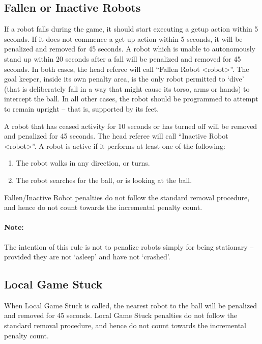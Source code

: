 \documentclass[12pt]{article}
\begin{document}
\subsection{Fallen or Inactive Robots}
\label{sec:fallenrobots}

If a robot falls during the game, it should start executing a getup action within 5 seconds. If it does not commence a get up action within 5 seconds, it will be penalized and removed for 45 seconds. 
A robot which is unable to autonomously stand up within 20 seconds after a fall will be penalized and removed for 45 seconds. 
In both cases, the head referee will call ``Fallen Robot  \textless robot\textgreater''.
The goal keeper, inside its own penalty area, is the only robot permitted to `dive' (that is deliberately fall in a way that might cause its torso, arms or hands) to intercept the ball. In all other cases, the robot should be programmed to attempt to remain upright -- that is, supported by its feet.

A robot that has ceased activity for 10 seconds or has turned off will be removed and penalized for 45 seconds.
The head referee will call ``Inactive Robot  \textless robot\textgreater''.
A robot is active if it performs at least one of the following:
\begin{enumerate}
  \item The robot walks in any direction, or turns.
  \item The robot searches for the ball, or is looking at the ball.
\end{enumerate}

Fallen/Inactive Robot penalties do not follow the standard removal procedure, and hence do not count towards the incremental penalty count.

\paragraph{Note:} The intention of this rule is not to penalize robots simply for being stationary -- provided they are not `asleep' and have not `crashed'.

\subsection{Local Game Stuck}
\label{sec:pen_local_game_stuck}

When Local Game Stuck is called, the nearest robot to the ball will be penalized and removed for 45 seconds. Local Game Stuck penalties do not follow the standard removal procedure, and hence do not count towards the incremental penalty count.
\end{document}
